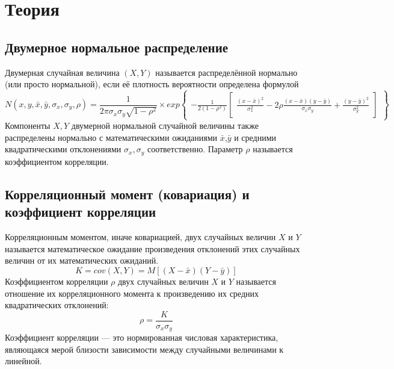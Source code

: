 \documentclass[12pt]{article}
\begin{document}
	\section{Теория}
	\subsection{Двумерное нормальное распределение}
	Двумерная случайная величина $(X,Y)$ называется распределённой нормально (или просто нормальной), если её плотность вероятности определена формулой
	\begin{equation}
		N(x, y, \bar{x}, \bar{y}, \sigma_{x}, \sigma_{y}, \rho) = 
		\frac{1}{2\pi\sigma_{x}\sigma_{y}\sqrt{1-\rho^{2}}} \times
		exp{\begin{Bmatrix}
				-\frac{1}{2(1-\rho^{2})}
				\begin{bmatrix}
					\frac{(x-\bar{x})^{2}}{\sigma_{x}^{2}} - 2\rho\frac{(x-\bar{x})(y-\bar{y})}{\sigma_{x}\sigma_{y}} + \frac{(y-\bar{y})^{2}}{\sigma_{y}^{2}}
				\end{bmatrix}
		\end{Bmatrix}}
	\end{equation}
	Компоненты $X,Y$ двумерной нормальной случайной величины также распределены нормально с математическими ожиданиями $\bar{x}$,$\bar{y}$ и средними квадратическими отклонениями $\sigma_{x},\sigma_{y}$ соответственно.
	Параметр $\rho$ называется коэффициентом корреляции.
	
	
	\subsection{Корреляционный момент (ковариация) и коэффициент корреляции}
	Корреляционным моментом, иначе ковариацией, двух случайных величин $X$ и $Y$ называется математическое ожидание произведения отклонений этих случайных величин от их математических ожиданий.
	\begin{equation}
		K = cov(X, Y) = M[(X - \bar{x})(Y - \bar{y})]
		\label{K}
	\end{equation}
	Коэффициентом корреляции $\rho$ двух случайных величин $X$ и $Y$ называется отношение их корреляционного момента к произведению их средних квадратических отклонений:
	\begin{equation}
		\rho = \frac{K}{\sigma_{x}\sigma_{y}}
		\label{ro}
	\end{equation}
	Коэффициент корреляции — это нормированная числовая характеристика, являющаяся мерой близости зависимости между случайными величинами к линейной.
	
\end{document}
